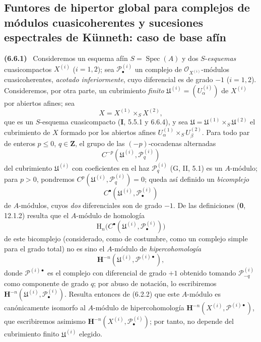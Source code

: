 \documentclass[10pt,oneside]{book}
\newenvironment{env}[1][]{\par\medskip\noindent\textbf{(#1)}\ }{\par}
\begin{document}
\subsection{Funtores de hipertor global para complejos de módulos
cuasicoherentes y sucesiones espectrales de Künneth: caso de base afín}
\label{subsection:III.6.6}

\begin{env}[6.6.1]
\label{III.6.6.1}
Consideremos un esquema afín $S=\operatorname{Spec}(A)$ y dos $S$-\emph{esquemas}
cuasicompactos $X^{(i)}$ ($i=1,2$); sea $\mathscr P_\bullet^{(i)}$ un complejo
de $\mathscr O_{X^{(i)}}$-módulos cuasicoherentes, \emph{acotado inferiormente},
cuyo diferencial es de grado $-1$ ($i=1,2$). Consideremos, por otra parte, un
cubrimiento \emph{finito}
$\mathfrak U^{(i)}=(U_\alpha^{(i)})$ de $X^{(i)}$ por abiertos afines; sea
\[
  X=X^{(1)}\times_S X^{(2)},
\]
que es un $S$-esquema cuasicompacto (\textbf I, 5.5.1 y 6.6.4), y sea
$\mathfrak U=\mathfrak U^{(1)}\times_S\mathfrak U^{(2)}$ el cubrimiento de
$X$ formado por los abiertos afines
$U_\alpha^{(1)}\times_S U_\beta^{(2)}$. Para todo par de enteros
$p\leqslant0$, $q\in\mathbf Z$, el grupo de las $(-p)$-cocadenas alternadas
\[
  C^{-p}(\mathfrak U^{(i)},\mathscr P_q^{(i)})
\]
del cubrimiento $\mathfrak U^{(i)}$ con coeficientes en el haz
$\mathscr P_q^{(i)}$ (G, II, 5.1) es un $A$-módulo; para $p>0$, pondremos
$C^p(\mathfrak U^{(i)},\mathscr P_q^{(i)})=0$; queda así definido un
\emph{bicomplejo}
\[
  C^\bullet(\mathfrak U^{(i)},\mathscr P_\bullet^{(i)})
\]
de $A$-módulos, cuyos \emph{dos} diferenciales son de grado $-1$. De las
definiciones (\textbf{0}, 12.1.2) resulta que el $A$-módulo de homología
\[
  \mathrm H_n\bigl(C^\bullet
  (\mathfrak U^{(i)},\mathscr P_\bullet^{(i)})\bigr)
\]
de este bicomplejo (considerado, como de costumbre, como un complejo simple
para el grado total) no es sino el $A$-módulo de \emph{hipercohomología}
\[
  \mathbf H^{-n}
  (\mathfrak U^{(i)},\mathscr P^{(i)\bullet}),
\]
donde $\mathscr P^{(i)\bullet}$ es el complejo con diferencial de grado $+1$
obtenido tomando $\mathscr P_{-q}^{(i)}$ como componente de grado $q$; por
abuso de notación, lo escribiremos
$\mathbf H^{-n}(\mathfrak U^{(i)},\mathscr P_\bullet^{(i)})$. Resulta entonces
de (6.2.2) que este $A$-módulo es canónicamente isomorfo al $A$-módulo de
hipercohomología
$\mathbf H^{-n}(X^{(i)},\mathscr P^{(i)\bullet})$, que escribiremos asimismo
$\mathbf H^{-n}(X^{(i)},\mathscr P_\bullet^{(i)})$; por tanto, no depende del
cubrimiento finito $\mathfrak U^{(i)}$ elegido.
\end{env}
\end{document}
